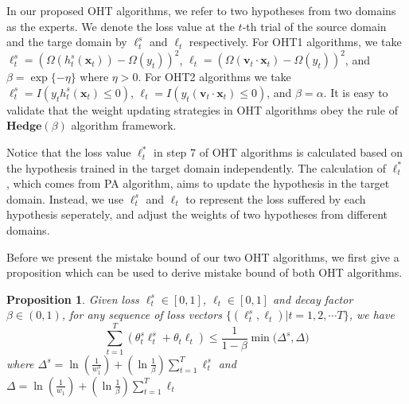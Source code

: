 \documentclass[letterpaper]{article}
\newtheorem{prop}{Proposition}
\theoremstyle{remark}
\theoremstyle{definition}
\begin{document}
In our proposed OHT algorithms, we refer to two hypotheses from two domains as the experts.
We denote the loss value at the $t$-th trial of the source domain and the targe domain by $\ell_{t}^{s}$ and $\ell_t$ respectively.
For OHT1 algorithms, we take $\ell_{t}^{s} = (\varOmega(h_{t}^{s}(\mathbf{x}_t)) - \varOmega(y_t)) ^ 2$, $\ell_t = (\varOmega(\mathbf{v}_t \cdot \mathbf{x}_t) - \varOmega(y_t)) ^ 2$, and $\beta = \exp\{-\eta\}$ where $\eta > 0$.
For OHT2 algorithms we take $\ell_{t}^{s} = I(y_t h_{t}^{s}(\mathbf{x}_t) \leq 0)$, $\ell_t = I(y_t (\mathbf{v}_t \cdot \mathbf{x}_t) \leq 0)$, and $\beta = \alpha$.
It is easy to validate that the weight updating strategies in OHT algorithms obey the rule of $\mathbf{Hedge}(\beta)$ algorithm framework.

Notice that the loss value $\ell_{t}^{*}$ in step 7 of OHT algorithms is calculated based on the hypothesis trained in the target domain independently.
The calculation of $\ell_{t}^{*}$, which comes from PA algorithm, aims to update the hypothesis in the target domain.
Instead, we use $\ell_{t}^{s}$ and $\ell_t$ to represent the loss suffered by each hypothesis seperately, and adjust the weights of two hypotheses from different domains.

Before we present the mistake bound of our two OHT algorithms, we first give a proposition which can be used to derive mistake bound of both OHT algorithms.

\begin{prop}
Given loss $\ell_{t}^{s} \in [0,1]$, $\ell_t \in [0,1]$ and decay factor $\beta \in (0,1)$, for any sequence of loss vectors $\{ (\ell_{t}^{s}, \ell_{t}) | t = 1, 2, \cdots T \} $, we have
$$ \sum\limits_{t=1}^{T} ( \theta_{t}^{s} \ell_{t}^{s} + \theta_t \ell_t ) \leq \frac{1}{1-\beta} \min \big( \varDelta^s, \varDelta \big) $$
where
$ \varDelta^s = \ln(\frac{1}{w_{1}^{s}}) + (\ln \frac{1}{\beta}) \sum\limits_{t=1}^{T} \ell_{t}^{s} $ and $ \varDelta = \ln(\frac{1}{w_{1}}) + (\ln \frac{1}{\beta}) \sum\limits_{t=1}^{T} \ell_{t} $
\end{prop}
\end{document}
